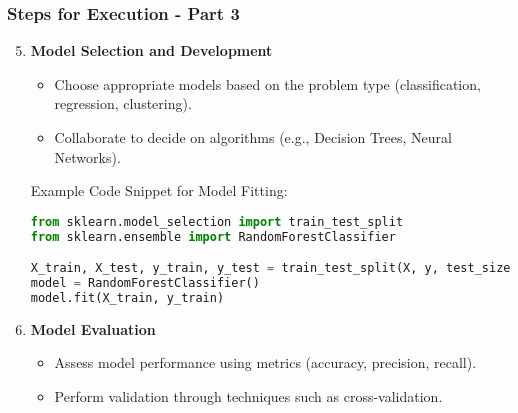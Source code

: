 \documentclass[aspectratio=169]{beamer}
\begin{document}
\begin{frame}[fragile]
    \frametitle{Steps for Execution - Part 3}
    \begin{enumerate}
        \setcounter{enumi}{4} %
        \item \textbf{Model Selection and Development}
            \begin{itemize}
                \item Choose appropriate models based on the problem type (classification, regression, clustering).
                \item Collaborate to decide on algorithms (e.g., Decision Trees, Neural Networks).
            \end{itemize}
            Example Code Snippet for Model Fitting:
            \begin{lstlisting}[language=Python]
from sklearn.model_selection import train_test_split
from sklearn.ensemble import RandomForestClassifier

X_train, X_test, y_train, y_test = train_test_split(X, y, test_size=0.2)
model = RandomForestClassifier()
model.fit(X_train, y_train)
            \end{lstlisting}
        
        \item \textbf{Model Evaluation}
            \begin{itemize}
                \item Assess model performance using metrics (accuracy, precision, recall).
                \item Perform validation through techniques such as cross-validation.
            \end{itemize}
    \end{enumerate}
\end{frame}
\end{document}
